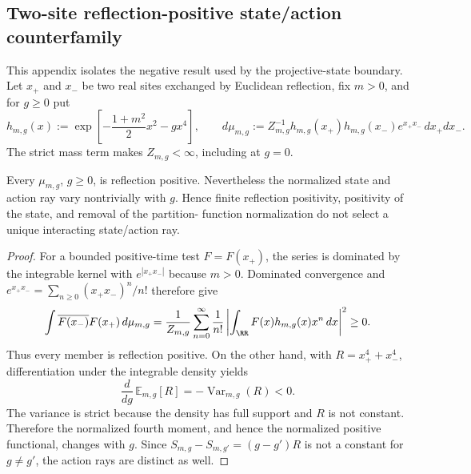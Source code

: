 \documentclass[12pt,a4paper]{article}
\begin{document}




\subsection{Two-site reflection-positive state/action counterfamily}
\label{p12:app:two-site-reflection-positive-no-go}

This appendix isolates the negative result used by the projective-state
boundary.  Let \(x_+\) and \(x_-\) be two real sites exchanged by Euclidean
reflection, fix \(m>0\), and for \(g\ge0\) put
\[
 h_{m,g}(x)
 :=\exp\!\left[-\frac{1+m^2}{2}x^2-gx^4\right],
 \qquad
 d\mu_{m,g}
 :=Z_{m,g}^{-1}h_{m,g}(x_+)h_{m,g}(x_-)
   e^{x_+x_-}\,dx_+dx_-.
\]
The strict mass term makes \(Z_{m,g}<\infty\), including at \(g=0\).

\begin{proposition}
\label{p12:prop:two-site-reflection-positive-no-go}
Every \(\mu_{m,g}\), \(g\ge0\), is reflection positive.  Nevertheless the
normalized state and action ray vary nontrivially with \(g\).  Hence finite
reflection positivity, positivity of the state, and removal of the partition-
function normalization do not select a unique interacting state/action ray.
\end{proposition}

\begin{proof}
For a bounded positive-time test \(F=F(x_+)\), the series is dominated by
the integrable kernel with \(e^{|x_+x_-|}\) because \(m>0\).  Dominated
convergence and
\(e^{x_+x_-}=\sum_{n\ge0}(x_+x_-)^n/n!\) therefore give
\[
 \int\overline{F(x_-)}F(x_+)\,d\mu_{m,g}
 =\frac1{Z_{m,g}}
  \sum_{n=0}^{\infty}\frac1{n!}
  \left|\int_{\RR}F(x)h_{m,g}(x)x^n\,dx\right|^2
 \ge0.
\]
Thus every member is reflection positive.  On the other hand, with
\(R=x_+^4+x_-^4\), differentiation under the integrable density yields
\[
 \frac d{dg}\,\mathbb E_{m,g}[R]
 =-\operatorname{Var}_{m,g}(R)<0.
\]
The variance is strict because the density has full support and \(R\) is not
constant.  Therefore the normalized fourth moment, and hence the normalized
positive functional, changes with \(g\).  Since
\(S_{m,g}-S_{m,g'}=(g-g')R\) is not a constant for \(g\ne g'\), the action
rays are distinct as well.
\end{proof}
\end{document}
